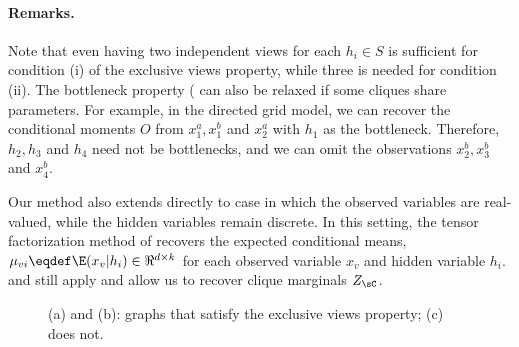 \paragraph{Remarks.}
Note that even having two independent views for each $h_i \in S$ is sufficient for condition (i)
  of the exclusive views property, while three is needed for condition (ii).
The bottleneck property ( can also be relaxed if some cliques
  share parameters.
For example, in the directed grid model, we can recover the conditional moments $O$ from
  $x^a_1, x^b_1$ and $x^a_2$ with $h_1$ as the bottleneck.
  Therefore, $h_2, h_3$ and $h_4$
  need not be bottlenecks, and we can omit the observations $x^b_2, x^b_3$ and $x^b_4$.

Our method also extends directly to case in which the observed variables
  are real-valued, while the hidden variables remain discrete. 
In this setting, the tensor factorization method of
  \citet{anandkumar13tensor} recovers the expected conditional means,
  $\mu_{vi} \eqdef \E(x_v | h_i) \in \Re^{d \times k}$ for each observed variable $x_v$ and
  hidden variable $h_i$.
 and  still apply and allow
  us to recover clique marginals $Z_\sC$.

\begin{figure}
  \centering
  \caption{(a) and (b): graphs that satisfy the exclusive views property; (c) does not.}
  \label{fig:examples}
\end{figure}


